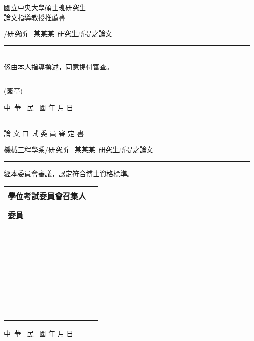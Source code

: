 \documentclass[twoside,noframe]{ncuthesisXe}%
\begin{document}
\pagestyle{empty}

\begin{center}
{\Huge\sffamily 國立中央大學碩士班研究生\\[1cm]
論文指導教授推薦書\par}

\vspace{4cm}

{/研究所 \, 某某某 \,研究生所提之論文\\[1cm]
\rule{0.8\textwidth}{1pt}\\[1cm]
係由本人指導撰述，同意提付審查。\par}
\vspace{4cm}
{\rule{5cm}{1pt} (簽章)\par} 
\vspace{5cm}
{\large     中~華 ~民 ~國  \quad       年  \quad    月 \quad   日}
\end{center}

\newpage
\null\vfil
\newpage
\begin{center}
{\Huge\sffamily{} \\[1cm]
論 文 口 試 委 員 審 定 書\par}

\vspace{4cm}
{\LARGE 機械工程學系/研究所 \, 某某某 \,研究生所提之論文\\[1cm]
\rule{0.8\textwidth}{1pt}\par
經本委員會審議，認定符合博士資格標準。\par}
\vspace{2cm}
\begin{tabular}{l@{}r}
{\bfseries\Large 學位考試委員會召集人} &  \rule{0.5\textwidth}{1pt}\\[0.5cm]
{\bfseries\Large 委\hspace{4cm}員}  &  \rule{0.5\textwidth}{1pt}\\[0.7cm]
&  \rule{0.5\textwidth}{1pt}\\[0.7cm]
&  \rule{0.5\textwidth}{1pt}\\[0.7cm]
&  \rule{0.5\textwidth}{1pt}\\[0.7cm]
&  \rule{0.5\textwidth}{1pt}\\[0.7cm]
&  \rule{0.5\textwidth}{1pt}\\[0.7cm]
\end{tabular}\par
\vspace{1.5cm}
{\large 中~華 ~民 ~國  \quad        年  \quad         月 \quad         日}
\end{center}
\clearpage
\null\vfil
\end{document}
